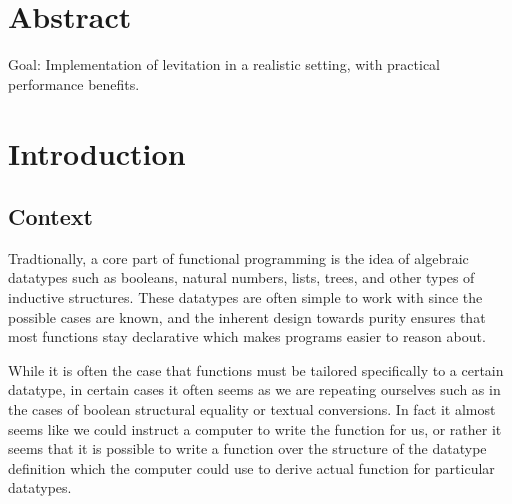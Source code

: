 \documentclass{ituthesis}
\begin{document}

\frontmatter

\thetitlepage
\newpage

\chapter*{Abstract}
Goal: Implementation of levitation in a realistic setting, with practical performance benefits.

\cleardoublepage
\setcounter{tocdepth}{1}
\tableofcontents

\mainmatter

\midsloppy
\sloppybottom

\chapter{Introduction}
\label{cha:Intoduction}
\section{Context}
\label{sec:Context}
Tradtionally, a core part of functional programming is the idea of algebraic datatypes such as booleans, natural numbers, lists, trees, and other types of inductive structures. These datatypes are often simple to work with since the possible cases are known, and the inherent design towards purity ensures that
most functions stay declarative which makes programs easier to reason about.

While it is often the case that functions must be tailored specifically to a certain datatype, in certain cases it often seems as we are repeating ourselves such as in the cases of boolean structural equality or textual conversions.
In fact it almost seems like we could instruct a computer to write the function for us, or rather it seems that it is possible to write a function over the structure of the datatype definition which the computer could use to derive
actual function for particular datatypes.
\end{document}
